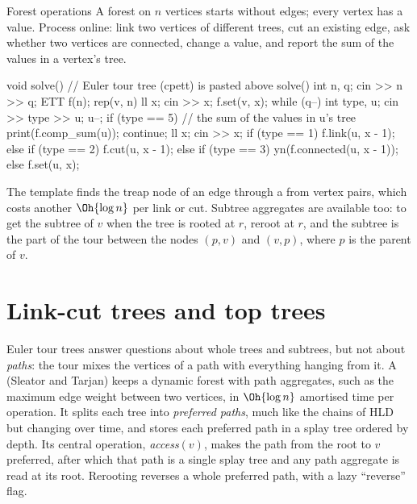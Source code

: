 \begin{problem}{Forest operations}
A forest on $n$ vertices starts without edges; every vertex has a value. Process online: link two vertices of different trees,
cut an existing edge, ask whether two vertices are connected, change a value, and report the sum of the values in a vertex's tree.
\end{problem}

\begin{code}
void solve() {  // Euler tour tree (cpett) is pasted above solve()
    int n, q;
    cin >> n >> q;
    ETT f(n);
    rep(v, n) {
        ll x;
        cin >> x;
        f.set(v, x);
    }
    while (q--) {
        int type, u;
        cin >> type >> u;
        u--;
        if (type == 5) {  // the sum of the values in u's tree
            print(f.comp_sum(u));
            continue;
        }
        ll x;
        cin >> x;
        if (type == 1) f.link(u, x - 1);
        else if (type == 2) f.cut(u, x - 1);
        else if (type == 3) yn(f.connected(u, x - 1));
        else f.set(u, x);
    }
}
\end{code}


The template finds the treap node of an edge through a  from vertex pairs, which costs another $\Oh{\log n}$ per link or
cut. Subtree aggregates are available too: to get the subtree of $v$ when the tree is rooted at $r$, reroot at $r$, and the subtree
is the part of the tour between the nodes $(p, v)$ and $(v, p)$, where $p$ is the parent of $v$.

\section[Link-cut trees and top trees]{Link-cut trees and top trees \hfill \ioi}\label{sec:lct}

Euler tour trees answer questions about whole trees and subtrees, but not about \emph{paths}: the tour mixes the vertices of a path
with everything hanging from it. A  (Sleator and Tarjan) keeps a dynamic forest with path aggregates, such as
the maximum edge weight between two vertices, in $\Oh{\log n}$ amortised time per operation. It splits each tree into
\emph{preferred paths}, much like the chains of HLD but changing over time, and stores each preferred path in a splay tree ordered
by depth. Its central operation, \emph{access}$(v)$, makes the path from the root to $v$ preferred, after which that path is a
single splay tree and any path aggregate is read at its root. Rerooting reverses a whole preferred path, with a lazy ``reverse''
flag.

